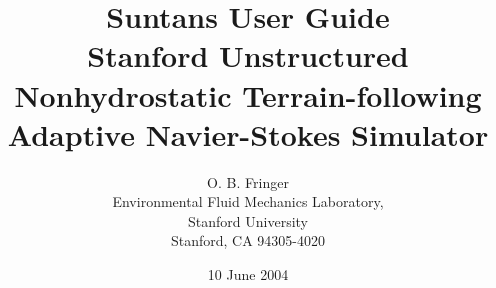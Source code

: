 \documentclass[12pt,oneside]{article}
\newif\ifpdf\ifx\pdfoutput\undefined\pdffalse\else\pdfoutput=1\pdftrue\fi
\newcommand{\pdfgraphics}{\ifpdf\DeclareGraphicsExtensions{.pdf,.jpg}\else\fi}
\begin{document}
\pdfgraphics

\title{Suntans User Guide\\
{\large Stanford Unstructured Nonhydrostatic 
Terrain-following Adaptive Navier-Stokes Simulator}}
\author{O. B. Fringer\\
\small
Environmental Fluid Mechanics Laboratory,  \\
Stanford University\\
Stanford, CA 94305-4020
\normalsize}
\date{10 June 2004}

\maketitle

\tableofcontents

\section{Downloading and installing Suntans}

In order to use Suntans, you must also install the message-passing
interface (MPI), the parallel graph partitioning libraries (ParMetis~\cite{PARMETIS[1998]}),
the grid generation package Triangle~\cite{TRIANGLE[1996]}.  Instructions for 
downloading and installing these packages are available from the individual websites
for each package:
\begin{tabbing}
MPI\hspace{0.5in}\=  \verb+http://www-unix.mcs.anl.gov/mpi/mpich/+\\
ParMetis \> \verb+http://www-users.cs.umn.edu/~karypis/metis/parmetis/+\\
Triangle \> \verb+http://www-2.cs.cmu.edu/~quake/triangle.html+
\end{tabbing}
Note that you must compile the triangle libraries as object files by making them
with \verb+make trilibrary+.
\end{document}
